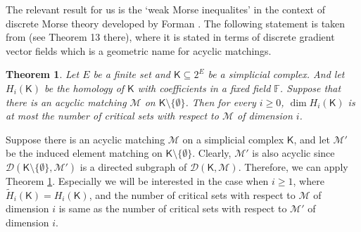 \documentclass[10pt]{amsart}
\newcommand{\MM}{\mathcal{M}}
\newcommand{\DD}{\mathcal{D}}
\newtheorem{thm}{Theorem}[section]
\theoremstyle{definition}
\newtheorem{eg}[thm]{Example}
\begin{document}
	
	
	
	
	\medskip
	
	The relevant result for us is the `weak Morse inequalites' in the context of discrete Morse theory developed by Forman \cite{forman_discrete_morse_origin}. The following statement is taken from \cite{forman_lecture} (see Theorem 13 there), where it is stated in terms of discrete gradient vector fields which is a geometric name for acyclic matchings.
	
	\begin{thm} \label{morse_fundamental}
		Let $E$ be a finite set and $\mathsf{K}\subseteq 2^E$ be a simplicial complex. And let $H_i(\mathsf{K})$ be the homology of $\mathsf{K}$ with coefficients in a fixed field $\mathbb{F}$. Suppose that there is an acyclic matching $\MM$ on $\mathsf{K} \setminus \{\emptyset \}$. Then for every $i\geq 0$,
		$\dim H_i(\mathsf{K})$ is at most the number of critical sets with respect to $\MM$ of dimension $i$.
	\end{thm}
	
	Suppose there is an acyclic matching $\MM$ on a simplicial complex $\mathsf{K}$, and let $\MM'$ be the induced element matching on $\mathsf{K}\setminus \{\emptyset \}$. Clearly, $\MM'$ is also acyclic since $\DD(\mathsf{K}\setminus \{\emptyset \},\MM')$ is a directed subgraph of $\DD(\mathsf{K}, \MM)$. Therefore, we can apply Theorem \ref{morse_fundamental}. Especially we will be interested in the case when $i\geq 1$, where $\tilde{H}_i(\mathsf{K})=H_i(\mathsf{K})$, and the number of critical sets with respect to $\MM$ of dimension $i$ is same as the number of critical sets with respect to $\MM'$ of dimension $i$.
	
\end{document}
